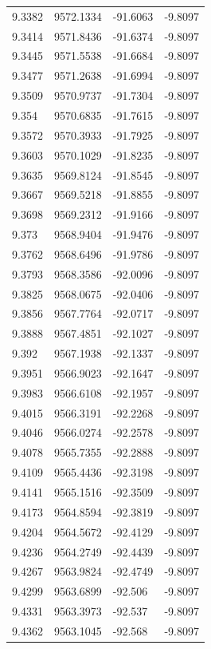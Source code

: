 \begin{table}[H]
\begin{tabular}{llll}
9.3382 & 9572.1334 & -91.6063 & -9.8097 \\
9.3414 & 9571.8436 & -91.6374 & -9.8097 \\
9.3445 & 9571.5538 & -91.6684 & -9.8097 \\
9.3477 & 9571.2638 & -91.6994 & -9.8097 \\
9.3509 & 9570.9737 & -91.7304 & -9.8097 \\
9.354 & 9570.6835 & -91.7615 & -9.8097 \\
9.3572 & 9570.3933 & -91.7925 & -9.8097 \\
9.3603 & 9570.1029 & -91.8235 & -9.8097 \\
9.3635 & 9569.8124 & -91.8545 & -9.8097 \\
9.3667 & 9569.5218 & -91.8855 & -9.8097 \\
9.3698 & 9569.2312 & -91.9166 & -9.8097 \\
9.373 & 9568.9404 & -91.9476 & -9.8097 \\
9.3762 & 9568.6496 & -91.9786 & -9.8097 \\
9.3793 & 9568.3586 & -92.0096 & -9.8097 \\
9.3825 & 9568.0675 & -92.0406 & -9.8097 \\
9.3856 & 9567.7764 & -92.0717 & -9.8097 \\
9.3888 & 9567.4851 & -92.1027 & -9.8097 \\
9.392 & 9567.1938 & -92.1337 & -9.8097 \\
9.3951 & 9566.9023 & -92.1647 & -9.8097 \\
9.3983 & 9566.6108 & -92.1957 & -9.8097 \\
9.4015 & 9566.3191 & -92.2268 & -9.8097 \\
9.4046 & 9566.0274 & -92.2578 & -9.8097 \\
9.4078 & 9565.7355 & -92.2888 & -9.8097 \\
9.4109 & 9565.4436 & -92.3198 & -9.8097 \\
9.4141 & 9565.1516 & -92.3509 & -9.8097 \\
9.4173 & 9564.8594 & -92.3819 & -9.8097 \\
9.4204 & 9564.5672 & -92.4129 & -9.8097 \\
9.4236 & 9564.2749 & -92.4439 & -9.8097 \\
9.4267 & 9563.9824 & -92.4749 & -9.8097 \\
9.4299 & 9563.6899 & -92.506 & -9.8097 \\
9.4331 & 9563.3973 & -92.537 & -9.8097 \\
9.4362 & 9563.1045 & -92.568 & -9.8097 \\

\end{tabular}
\end{table}
